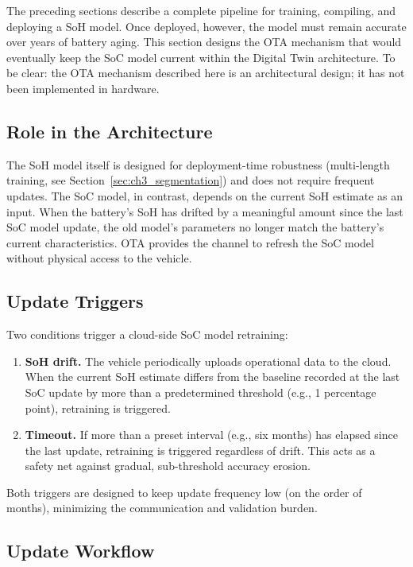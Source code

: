 The preceding sections describe a complete pipeline for training, compiling, and deploying a SoH model. Once deployed, however, the model must remain accurate over years of battery aging. This section designs the OTA mechanism that would eventually keep the SoC model current within the Digital Twin architecture. To be clear: the OTA mechanism described here is an architectural design; it has not been implemented in hardware.

\subsection{Role in the Architecture}

The SoH model itself is designed for deployment-time robustness (multi-length training, see Section~\ref{sec:ch3_segmentation}) and does not require frequent updates. The SoC model, in contrast, depends on the current SoH estimate as an input. When the battery's SoH has drifted by a meaningful amount since the last SoC model update, the old model's parameters no longer match the battery's current characteristics. OTA provides the channel to refresh the SoC model without physical access to the vehicle.

\subsection{Update Triggers}
\label{sec:ch3_ota_triggers}

Two conditions trigger a cloud-side SoC model retraining:

\begin{enumerate}
    \item \textbf{SoH drift.} The vehicle periodically uploads operational data to the cloud. When the current SoH estimate differs from the baseline recorded at the last SoC update by more than a predetermined threshold (e.g., 1 percentage point), retraining is triggered.
    \item \textbf{Timeout.} If more than a preset interval (e.g., six months) has elapsed since the last update, retraining is triggered regardless of drift. This acts as a safety net against gradual, sub-threshold accuracy erosion.
\end{enumerate}

Both triggers are designed to keep update frequency low (on the order of months), minimizing the communication and validation burden.

\subsection{Update Workflow}

